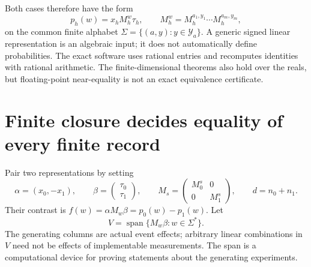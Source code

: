 Both cases therefore have the form
\begin{equation}\label{finite:linear}
 p_h(w)=x_hM_h^w\tau_h,\qquad
 M_h^w=M_h^{a_1,y_1}\cdots M_h^{a_m,y_m},
\end{equation}
on the common finite alphabet
$\Sigma=\{(a,y):y\in\mathcal Y_a\}$. A generic signed linear
representation is an algebraic input; it does not automatically define
probabilities. The exact software uses rational entries and recomputes
identities with rational arithmetic. The finite-dimensional theorems also
hold over the reals, but floating-point near-equality is not an exact
equivalence certificate.

\section{Finite closure decides equality of every finite record}

Pair two representations by setting
\begin{equation}\label{finite:paired}
 \alpha=(x_0,-x_1),\qquad
 \beta=\begin{pmatrix}\tau_0\\\tau_1\end{pmatrix},\qquad
 M_s=\begin{pmatrix}M_0^s&0\\0&M_1^s\end{pmatrix},\qquad
 d=n_0+n_1.
\end{equation}
Their contrast is $f(w)=\alpha M_w\beta=p_0(w)-p_1(w)$.
Let
\begin{equation}\label{finite:space}
 V=\operatorname{span}\{M_w\beta:w\in\Sigma^*\}.
\end{equation}
The generating columns are actual event effects; arbitrary linear
combinations in $V$ need not be effects of implementable measurements.
The span is a computational device for proving statements about the
generating experiments.

